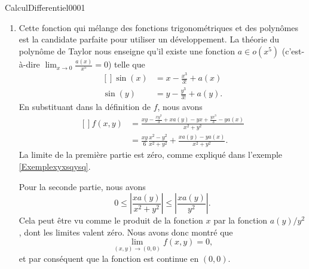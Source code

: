 \begin{corrige}{CalculDifferentiel0001}
\begin{enumerate}
		\item
			Cette fonction qui mélange des fonctions trigonométriques et des polynômes est la candidate parfaite pour utiliser un développement. La théorie du polynôme de Taylor nous enseigne qu'il existe une fonction $a\in o(x^5)$ (c'est-à-dire $\lim_{x\to 0} \frac{ a(x) }{ x^5 }=0$) telle que
			\begin{equation}
				\begin{aligned}[]
					\sin(x)&=x-\frac{ x^3 }{ 3! }+a(x)\\
					\sin(y)&=y-\frac{ y^3 }{ 3! }+a(y).
				\end{aligned}
			\end{equation}
			En substituant dans la définition de $f$, nous avons
			\begin{equation}
				\begin{aligned}[]
					f(x,y)&=\frac{ xy-\frac{ xy^3 }{3} +xa(y)-yx+\frac{ yx^3 }{ 3 }-ya(x) } { x^2+y^2 }\\
					&=\frac{ xy }{ 6 }\frac{ x^2-y^2 }{ x^2+y^2 }+\frac{ xa(y)-ya(x) }{ x^2+y^2 }.
				\end{aligned}
			\end{equation}
			La limite de la première partie est zéro, comme expliqué dans l'exemple \ref{Exemplexyxsqysq}.

			Pour la seconde partie, nous avons
			\begin{equation}
				0\leq\left| \frac{ xa(y) }{ x^2+y^2 } \right| \leq\left| \frac{ xa(y) }{ y^2 } \right| .
			\end{equation}
			Cela peut être vu comme le produit de la fonction $x$ par la fonction $a(y)/y^2$, dont les limites valent zéro. Nous avons donc montré que
			\begin{equation}
				\lim_{(x,y)\to(0,0)}f(x,y)=0,
			\end{equation}
			et par conséquent que la fonction est continue en $(0,0)$.


\end{enumerate}
\end{corrige}
